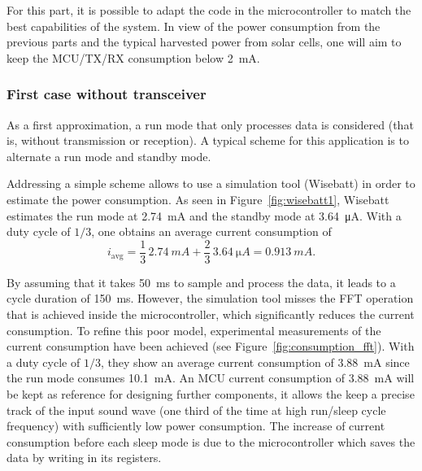\documentclass{EPL-master-thesis-covers-EN}
\newcommand{\te}[1]{\textrm{#1}}
\begin{document}

For this part, it is possible to adapt the code in the microcontroller to match the best capabilities of the system.
In view of the power consumption from the previous parts and the typical harvested power from solar cells, one will aim to keep the MCU/TX/RX consumption below \SI{2}{mA}. 

\subsubsection*{First case without transceiver}

As a first approximation, a run mode that only processes data is considered (that is, without transmission or reception). A typical scheme for this application is to alternate a run mode and standby mode.

Addressing a simple scheme allows to use a simulation tool (Wisebatt) in order to estimate the power consumption. As seen in Figure~\ref{fig:wisebatt1}, Wisebatt estimates the run mode at \SI{2.74}{mA} and the standby mode at \SI{3.64}{\micro A}. With a duty cycle of $1/3$, one obtains an average current consumption of
\[
 i_\te{avg} = \frac{1}{3} \, \SI{2.74}{mA} + \frac{2}{3} \, \SI{3.64}{\micro A} = \SI{0.913}{mA}.
\]

By assuming that it takes \SI{50}{ms} to sample and process the data, it leads to a cycle duration of \SI{150}{ms}. However, the simulation tool misses the FFT operation that is achieved inside the microcontroller, which significantly reduces the current consumption. To refine this poor model, experimental measurements of the current consumption have been achieved (see Figure~\ref{fig:consumption_fft}). With a duty cycle of $1/3$, they show an average current consumption of \SI{3.88}{mA} since the run mode consumes \SI{10.1}{mA}. An MCU current consumption of \SI{3.88}{mA} will be kept as reference for designing further components, it allows the keep a precise track of the input sound wave (one third of the time at high run/sleep cycle frequency) with sufficiently low power consumption. The increase of current consumption before each sleep mode is due to the microcontroller which saves the data by writing in its registers.
\end{document}
